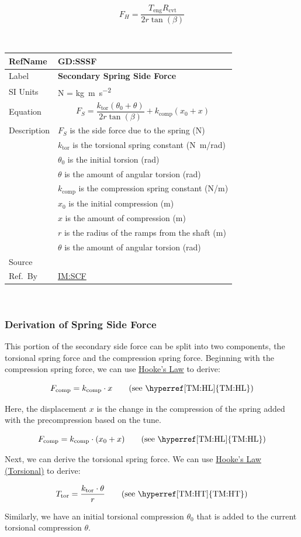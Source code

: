 \documentclass[12pt]{article}
\newcommand{\colAwidth}{0.13\textwidth}
\newcommand{\colBwidth}{0.82\textwidth}
\newcommand{\hpref}[1]{\hyperref[#1]{#1}}
\newcommand{\defgeneral}[7] {
~\newline
\noindent
\begin{minipage}{\textwidth}
\renewcommand*{\arraystretch}{1.5}
\begin{tabular}{| p{\colAwidth} | p{\colBwidth}|}
  \hline
  \rowcolor[gray]{0.9}
  RefName& \textbf{#1} \label{#1}\\
  \hline
  Label& \bf #2 \\
  \hline
  SI Units& #3\\
  \hline
  Equation& #4\\
  \hline
  Description& #5 \\
  \hline
  Source& #6 \\
  \hline
  Ref.\ By & #7\\
  \hline
\end{tabular}
\end{minipage}\\
}
\begin{document}
\[ F_H = \frac{T_\text{eng} R_\text{cvt}}{2r\tan(\beta)} \]


\defgeneral
{GD:SSSF}
{Secondary Spring Side Force} %
{N = \si{\kilogram \metre\per\square\second}} %
{\[F_S = \frac{k_{\text{tor}}(\theta_0 + \theta)}{2r\tan(\beta)} + k_\text{comp}(x_0 + x)\]} %
{$F_S$ is the side force due to the spring (N) \\
& $k_{\text{tor}}$ is the torsional spring constant (\si[per-mode=symbol] {\newton\metre\per\radian}) \\
& $\theta_0$ is the initial torsion (rad) \\
& $\theta$ is the amount of angular torsion (rad) \\
& $k_{\text{comp}}$ is the compression spring constant (\si[per-mode=symbol] {\newton\per\metre}) \\
& $x_0$ is the initial compression (m) \\
& $x$ is the amount of compression (m) \\
& $r$ is the radius of the ramps from the shaft (m) \\
& $\theta$ is the amount of angular torsion (rad)} %
{} %
{\hpref{IM:SCF}} %

\subsubsection*{Derivation of Spring Side Force}

This portion of the secondary side force can be split into two components, the torsional spring force and the compression spring force. 
Beginning with the compression spring force, we can use \hyperref[TM:HL]{Hooke's Law} to derive:

\[ F_{\text{comp}} = k_{\text{comp}} \cdot x \tag*{\text{(see \hyperref[TM:HL]{TM:HL})}}\]

Here, the displacement $x$ is the change in the compression of the spring added with the precompression based on the tune.

\[ F_{\text{comp}} = k_{\text{comp}} \cdot (x_0 + x) \tag*{\text{(see \hyperref[TM:HL]{TM:HL})}}\]

Next, we can derive the torsional spring force. We can use \hyperref[TM:HT]{Hooke's Law (Torsional)} to derive:

\[ T_{\text{tor}} = \frac{k_{\text{tor}} \cdot \theta}{r} \tag*{\text{(see \hyperref[TM:HT]{TM:HT})}}\]

Similarly, we have an initial torsional compression $\theta_0$ that is added to the current torsional compression $\theta$.
\end{document}
